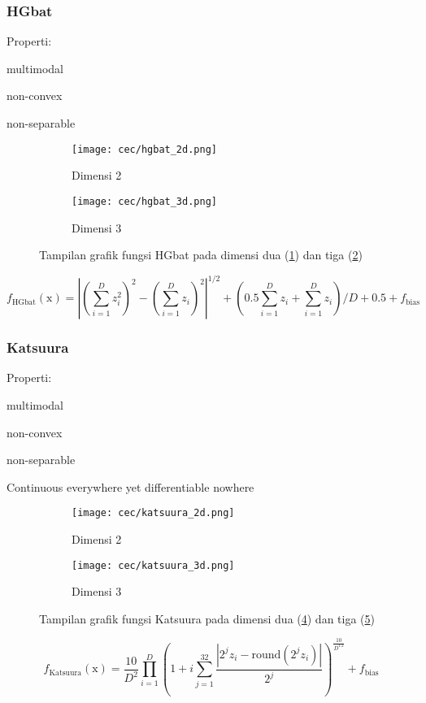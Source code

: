 \subsubsection*{HGbat}
\noindent Properti:
\begin{packed_item}
  \item multimodal
  \item non-convex
  \item non-separable
\end{packed_item}
\begin{figure}[H]
	\centering
	\begin{subfigure}[b]{0.4\textwidth}
		\centering
		\texttt{[image: cec/hgbat\_2d.png]}
		\caption{Dimensi 2}
		\label{fig:hgbat-2d}
	\end{subfigure}
	\hfill
	\begin{subfigure}[b]{0.4\textwidth}
		\centering
		\texttt{[image: cec/hgbat\_3d.png]}
		\caption{Dimensi 3}
		\label{fig:hgbat-3d}
	\end{subfigure}
	\caption{Tampilan grafik fungsi HGbat pada dimensi dua (\cref{fig:hgbat-2d}) dan tiga (\cref{fig:hgbat-3d})}
	\label{fig:hgbat}
\end{figure}
\begin{equation}
  f_{\text{HGbat}}(\mathrm{x})=\left|\left( \sum_{i=1}^{D}z_i^2\right)^2-\left(\sum_{i=1}^{D}z_i \right)^2  \right|^{1/2}+\left(0.5\sum_{i=1}^{D}z_i+\sum_{i=1}^{D}z_i \right)/D+0.5+f_{\text{bias}}
\end{equation}

\subsubsection*{Katsuura}
\noindent Properti:
\begin{packed_item}
  \item multimodal
  \item non-convex
  \item non-separable
  \item Continuous everywhere yet differentiable nowhere
\end{packed_item}
\begin{figure}[H]
	\centering
	\begin{subfigure}[b]{0.4\textwidth}
		\centering
		\texttt{[image: cec/katsuura\_2d.png]}
		\caption{Dimensi 2}
		\label{fig:katsuura-2d}
	\end{subfigure}
	\hfill
	\begin{subfigure}[b]{0.4\textwidth}
		\centering
		\texttt{[image: cec/katsuura\_3d.png]}
		\caption{Dimensi 3}
		\label{fig:katsuura-3d}
	\end{subfigure}
	\caption{Tampilan grafik fungsi Katsuura pada dimensi dua (\cref{fig:katsuura-2d}) dan tiga (\cref{fig:katsuura-3d})}
	\label{fig:katsuura}
\end{figure}
\begin{equation}
  f_{\text{Katsuura}}(\mathrm{x})=\frac{10}{D^2}\prod_{i=1}^{D}\left( 1+i\sum_{j=1}^{32}\frac{\left|2^j z_i-\text{round}\left( 2^jz_i\right)  \right| }{2^j}\right)^{\frac{10}{D^{1.2}}}+f_{\text{bias}}
\end{equation}

